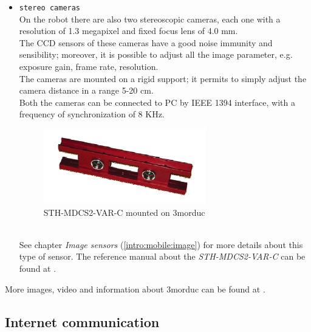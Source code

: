 \begin{itemize}
\item \texttt{stereo cameras} \\
  On the robot there are also two stereoscopic cameras, each one with a
  resolution of 1.3 megapixel and fixed focus lens of 4.0 mm. \\
  The CCD sensors of these cameras have a good noise immunity and
  sensibility; moreover, it is possible to adjust all the image parameter, e.g.
  exposure gain, frame rate, resolution. \\
  The cameras are mounted on a rigid support; it permits to simply adjust
  the camera distance in a range 5-20 cm. \\
  Both the cameras can be connected to PC by IEEE 1394 interface, with a
  frequency of synchronization of 8 KHz. \\
  \begin{figure}[h]
    \begin{center}
      \includegraphics[width=200pt]{img/camera_videre.png}
      \caption{STH-MDCS2-VAR-C mounted on 3morduc}
      \label{fig:camera_videre}
    \end{center}
  \end{figure}
  \\
  See chapter \textit{Image sensors} (\ref{intro:mobile:image}) for more details
  about this type of sensor. The reference manual about the \textit{STH-MDCS2-VAR-C}
  can be found at \cite{3morduc:camera_sth_mdcs2}.

  

\end{itemize}

More images, video and information about 3morduc can
be found at \cite{morduc:features}.


\subsection{Internet communication}
\label{intro:3morduc:communication}

